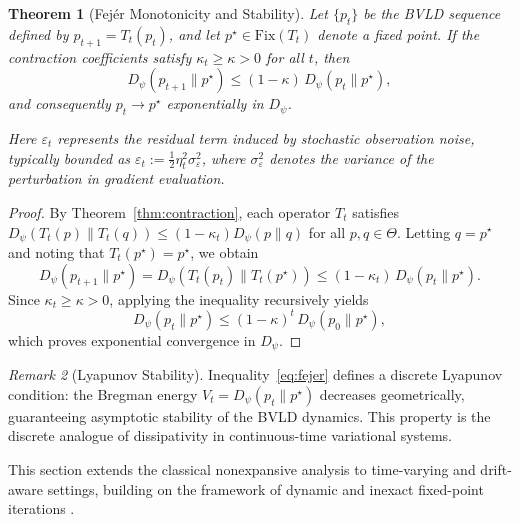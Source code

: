 \documentclass[11pt]{article}
\theoremstyle{plain}
\newtheorem{theorem}{Theorem}[section]
\theoremstyle{definition}
\theoremstyle{remark}
\newtheorem{remark}[theorem]{Remark}
\begin{document}
\begin{theorem}[Fejér Monotonicity and Stability]
\label{thm:fejer}
Let $\{p_t\}$ be the BVLD sequence defined by $p_{t+1}=T_t(p_t)$, and 
let $p^\star\in\mathrm{Fix}(T_t)$ denote a fixed point.  
If the contraction coefficients satisfy $\kappa_t\ge\kappa>0$ for all $t$, then
\begin{equation}
D_\psi(p_{t+1}\|p^\star)
\le(1-\kappa)\,D_\psi(p_t\|p^\star),
\label{eq:fejer}
\end{equation}
and consequently $p_t\to p^\star$ exponentially in $D_\psi$.

\noindent
Here $\varepsilon_t$ represents the residual term induced by stochastic observation noise,
typically bounded as $\varepsilon_t := \tfrac{1}{2}\eta_t^2\sigma_\varepsilon^2$,
where $\sigma_\varepsilon^2$ denotes the variance of the perturbation 
in gradient evaluation.
\end{theorem}


\begin{proof}
By Theorem~\ref{thm:contraction}, each operator $T_t$ satisfies 
$D_\psi(T_t(p)\|T_t(q))\le(1-\kappa_t)D_\psi(p\|q)$ for all $p,q\in\Theta$.  
Letting $q=p^\star$ and noting that $T_t(p^\star)=p^\star$, we obtain
\[
D_\psi(p_{t+1}\|p^\star)
=D_\psi(T_t(p_t)\|T_t(p^\star))
\le(1-\kappa_t)\,D_\psi(p_t\|p^\star).
\]
Since $\kappa_t\ge\kappa>0$, applying the inequality recursively yields
\[
D_\psi(p_t\|p^\star)
\le(1-\kappa)^t\,D_\psi(p_0\|p^\star),
\]
which proves exponential convergence in $D_\psi$.
\end{proof}

\begin{remark}[Lyapunov Stability]
\label{rem:stability}
Inequality~\eqref{eq:fejer} defines a discrete Lyapunov condition:
the Bregman energy $V_t=D_\psi(p_t\|p^\star)$ decreases geometrically,  
guaranteeing asymptotic stability of the BVLD dynamics.  
This property is the discrete analogue of dissipativity 
in continuous-time variational systems.
\end{remark}


This section extends the classical nonexpansive analysis 
to time-varying and drift-aware settings,
building on the framework of dynamic and inexact fixed-point iterations 
\cite{Combettes2014,Combettes2021,Hsieh2023}.
\end{document}
